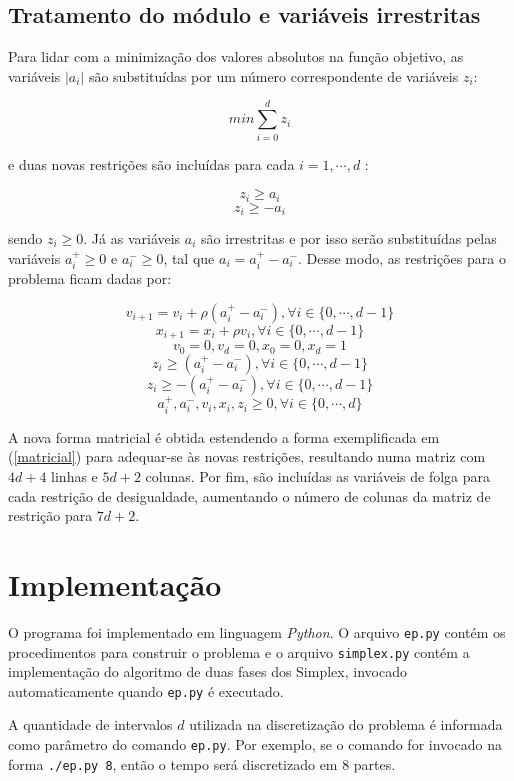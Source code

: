 \documentclass[10pt,oneside,a4paper]{article}
\begin{document}
\subsection{Tratamento do módulo e variáveis irrestritas}

Para lidar com a minimização dos valores absolutos na função objetivo, as variáveis $ |a_i| $ são substituídas por um número correspondente de variáveis $ z_i $: 

\[
min \sum_{i=0}^{d}z_i
\]

\noindent
e duas novas restrições são incluídas para cada $i = 1, \cdots, d$ :

\[
z_i \ge a_i
\] 
\[
z_i \ge -a_i
\] 

\noindent
sendo $z_i \ge 0$. Já as variáveis $a_i$ são irrestritas e por isso serão substituídas pelas variáveis $a_i^+ \ge 0$ e $a_i^- \ge 0$, tal que $a_i = a_i^+ - a_i^-$. Desse modo, as restrições para o problema ficam dadas por:

\[ v_{i+1} = v_i + \rho (a_i^+ - a_i^-), \forall i \in \{0, \dotsm, d-1\} \]
\[ x_{i+1} = x_i + \rho v_i, \forall i \in \{0, \dotsm, d-1\} \]
\[ v_0 = 0, v_d = 0, x_0 = 0, x_d = 1 \]
\[ z_i \ge (a_i^+ - a_i^-), \forall i \in \{0, \dotsm, d-1\} \]
\[ z_i \ge -(a_i^+ - a_i^-), \forall i \in \{0, \dotsm, d-1\} \]
\[ a_i^+, a_i^-, v_i, x_i, z_i \ge 0, \forall i \in \{0, \dotsm, d\} \]

A nova forma matricial é obtida estendendo a forma exemplificada em (\ref{matricial}) para adequar-se às novas restrições, resultando numa matriz com $ 4d+4 $ linhas e $ 5d+2 $ colunas. Por fim, são incluídas as variáveis de folga para cada restrição de desigualdade, aumentando o número de colunas da matriz de restrição para $ 7d+2 $.

\section{Implementação}

O programa foi implementado em linguagem \emph{Python}. O arquivo \texttt{ep.py} contém os procedimentos para construir o problema e o arquivo \texttt{simplex.py} contém a implementação do algoritmo de duas fases dos Simplex, invocado automaticamente quando \texttt{ep.py} é executado.

A quantidade de intervalos $d$ utilizada na discretização do problema é informada como parâmetro do comando \texttt{ep.py}. Por exemplo, se o comando for invocado na forma \texttt{./ep.py 8}, então o tempo será discretizado em 8 partes.
\end{document}
